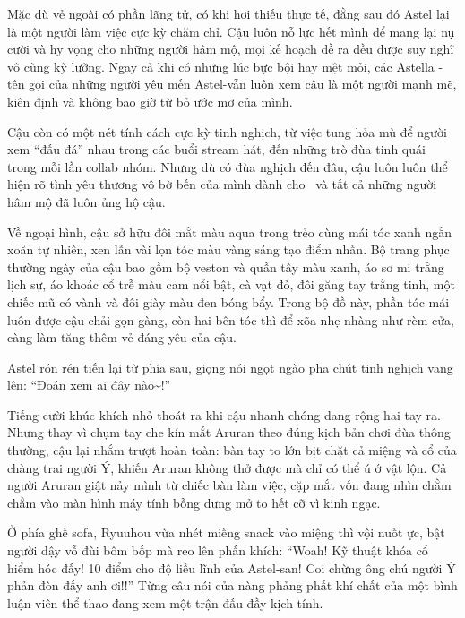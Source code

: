 \documentclass[../main.tex]{subfiles}
\begin{document}

Mặc dù vẻ ngoài có phần lãng tử, có khi hơi thiếu thực tế, đằng sau đó Astel lại là một người làm việc cực kỳ chăm chỉ. Cậu luôn nỗ lực hết mình để mang lại nụ cười và hy vọng cho những người hâm mộ, mọi kế hoạch đề ra đều được suy nghĩ vô cùng kỹ lưỡng. Ngay cả khi có những lúc bực bội hay mệt mỏi, các Astella - tên gọi của những người yêu mến Astel-vẫn luôn xem cậu là một người mạnh mẽ, kiên định và không bao giờ từ bỏ ước mơ của mình.

Cậu còn có một nét tính cách cực kỳ tinh nghịch, từ việc tung hỏa mù để người xem ``đấu đá'' nhau trong các buổi stream hát, đến những trò đùa tinh quái trong mỗi lần collab nhóm. Nhưng dù có đùa nghịch đến đâu, cậu luôn luôn thể hiện rõ tình yêu thương vô bờ bến của mình dành cho \hls\ và tất cả những người hâm mộ đã luôn ủng hộ cậu.

Về ngoại hình, cậu sở hữu đôi mắt màu aqua trong trẻo cùng mái tóc xanh ngắn xoăn tự nhiên, xen lẫn vài lọn tóc màu vàng sáng tạo điểm nhấn. Bộ trang phục thường ngày của cậu bao gồm bộ veston và quần tây màu xanh, áo sơ mi trắng lịch sự, áo khoác cổ trễ màu cam nổi bật, cà vạt đỏ, đôi găng tay trắng tinh, một chiếc mũ có vành và đôi giày màu đen bóng bẩy. Trong bộ đồ này, phần tóc mái luôn được cậu chải gọn gàng, còn hai bên tóc thì để xõa nhẹ nhàng như rèm cửa, càng làm tăng thêm vẻ đáng yêu của cậu.

\chrint

Astel rón rén tiến lại từ phía sau, giọng nói ngọt ngào pha chút tinh nghịch vang lên: ``Đoán xem ai đây nào\~{}!''

Tiếng cười khúc khích nhỏ thoát ra khi cậu nhanh chóng dang rộng hai tay ra. Nhưng thay vì chụm tay che kín mắt Aruran theo đúng kịch bản chơi đùa thông thường, cậu lại nhắm trượt hoàn toàn: bàn tay to lớn bịt chặt cả miệng và cổ của chàng trai người Ý, khiến Aruran không thở được mà chỉ có thể ú ớ vật lộn. Cả người Aruran giật nảy mình từ chiếc bàn làm việc, cặp mắt vốn đang nhìn chằm chằm vào màn hình máy tính bỗng dưng mở to hết cỡ vì kinh ngạc.


Ở phía ghế sofa, Ryuuhou vừa nhét miếng snack vào miệng thì vội nuốt ực, bật người dậy vỗ đùi bôm bốp mà reo lên phấn khích: ``Woah! Kỹ thuật khóa cổ hiểm hóc đấy! 10 điểm cho độ liều lĩnh của Astel-san! Coi chừng ông chú người Ý phản đòn đấy anh ơi!!'' Từng câu nói của nàng phảng phất khí chất của một bình luận viên thể thao đang xem một trận đấu đầy kịch tính.
\end{document}
